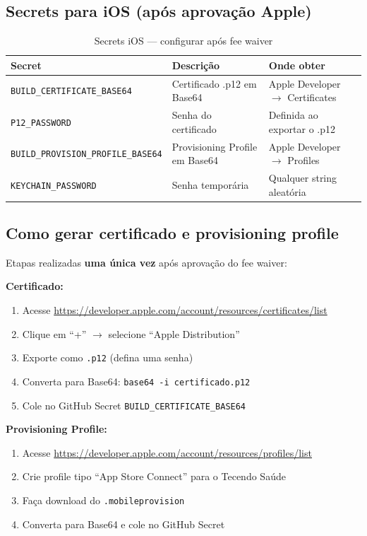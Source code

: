 \documentclass[12pt, a4paper]{article}
\begin{document}
\subsection{Secrets para iOS (ap\'os aprova\c{c}\~ao Apple)}

\begin{table}[H]
\centering
\renewcommand{\arraystretch}{1.4}
\begin{tabularx}{\textwidth}{|l|X|X|}
\hline
\rowcolor{roxo}
\textbf{\color{white}Secret} & \textbf{\color{white}Descri\c{c}\~ao} & \textbf{\color{white}Onde obter} \\
\hline
\texttt{BUILD\_CERTIFICATE\_BASE64} & Certificado .p12 em Base64 & Apple Developer $\rightarrow$ Certificates \\
\hline
\rowcolor{cinzaC}
\texttt{P12\_PASSWORD} & Senha do certificado & Definida ao exportar o .p12 \\
\hline
\texttt{BUILD\_PROVISION\_PROFILE\_BASE64} & Provisioning Profile em Base64 & Apple Developer $\rightarrow$ Profiles \\
\hline
\rowcolor{cinzaC}
\texttt{KEYCHAIN\_PASSWORD} & Senha tempor\'aria & Qualquer string aleat\'oria \\
\hline
\end{tabularx}
\caption{Secrets iOS --- configurar ap\'os fee waiver}
\end{table}

\subsection{Como gerar certificado e provisioning profile}

Etapas realizadas \textbf{uma \'unica vez} ap\'os aprova\c{c}\~ao do fee waiver:

\textbf{Certificado:}
\begin{enumerate}
  \item Acesse \url{https://developer.apple.com/account/resources/certificates/list}
  \item Clique em ``+'' $\rightarrow$ selecione ``Apple Distribution''
  \item Exporte como \texttt{.p12} (defina uma senha)
  \item Converta para Base64: \texttt{base64 -i certificado.p12}
  \item Cole no GitHub Secret \texttt{BUILD\_CERTIFICATE\_BASE64}
\end{enumerate}

\textbf{Provisioning Profile:}
\begin{enumerate}
  \item Acesse \url{https://developer.apple.com/account/resources/profiles/list}
  \item Crie profile tipo ``App Store Connect'' para o Tecendo Sa\'ude
  \item Fa\c{c}a download do \texttt{.mobileprovision}
  \item Converta para Base64 e cole no GitHub Secret
\end{enumerate}
\end{document}
